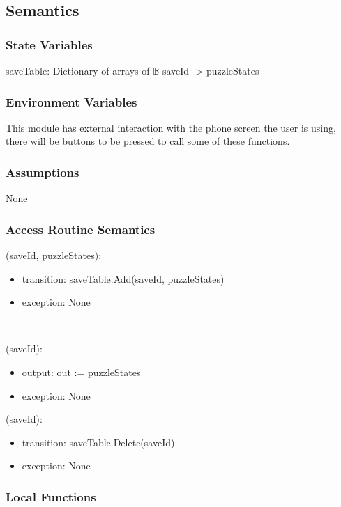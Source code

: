 \documentclass[12pt, titlepage]{article}
\begin{document}
\subsection{Semantics}

\subsubsection{State Variables}

saveTable: Dictionary of arrays of $\mathbb{B}$ {saveId -> puzzleStates}

\subsubsection{Environment Variables}

This module has external interaction with the phone screen the user is using, there will be buttons to be pressed to call some of these functions.

\subsubsection{Assumptions}

None

\subsubsection{Access Routine Semantics}

(saveId, puzzleStates):
\begin{itemize}
\item transition: saveTable.Add(saveId, puzzleStates)
\item exception: None
\end{itemize}\

(saveId):
\begin{itemize}
\item output: out := puzzleStates
\item exception: None
\end{itemize}

(saveId):
\begin{itemize}
\item transition: saveTable.Delete(saveId)
\item exception: None
\end{itemize}

\subsubsection{Local Functions}
\end{document}
